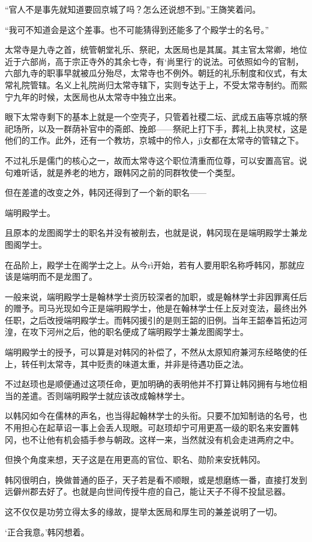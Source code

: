 “官人不是事先就知道要回京城了吗？怎么还说想不到。”王旖笑着问。

“我可不知道会是这个差事。也不可能猜得到还能多了个殿学士的名号。”

太常寺是九寺之首，统管朝堂礼乐、祭祀，太医局也是其属。其主官太常卿，地位近于六部尚，高于宗正寺外的其余七寺，有‘尚里行’的说法。可依照如今的官制，六部九寺的职事早就被瓜分殆尽，太常寺也不例外。朝廷的礼乐制度和仪式，有太常礼院管辖。名义上礼院尚归太常寺辖下，实则专达于上，不受太常寺制约。而熙宁九年的时候，太医局也从太常寺中独立出来。

眼下太常寺剩下的基本上就是一个空壳子，只管着社稷二坛、武成五庙等京城的祭祀场所，以及一群荫补官中的斋郎、挽郎——祭祀上打下手，葬礼上执灵杖，这是他们的工作。此外，还有一个教坊，京城中的伶人，jì女都在太常寺的管辖之下。

不过礼乐是儒门的核心之一，故而太常寺这个职位清重而位尊，可以安置高官。说句难听话，就是养老的地方，跟韩冈之前的同群牧使一个类型。

但在差遣的改变之外，韩冈还得到了一个新的职名——

端明殿学士。

且原本的龙图阁学士的职名并没有被削去，也就是说，韩冈现在是端明殿学士兼龙图阁学士。

在品阶上，殿学士在阁学士之上。从今rì开始，若有人要用职名称呼韩冈，那就应该是端明而不是龙图了。

一般来说，端明殿学士是翰林学士资历较深者的加职，或是翰林学士非因罪离任后的赠予。司马光现如今正是端明殿学士，他是在翰林学士任上反对变法，最终出外任职，之后改授端明殿学士。而韩冈援引的是则王韶的旧例。当年王韶奉旨拓边河湟，在攻下河州之后，他的职名便成了端明殿学士兼龙图阁学士。

端明殿学士的授予，可以算是对韩冈的补偿了，不然从太原知府兼河东经略使的任上，转任判太常寺，其中贬责的味道太重，并非是待遇功臣之法。

不过赵顼也是顺便通过这项任命，更加明确的表明他并不打算让韩冈拥有与地位相当的差遣。否则端明殿学士就应该改成翰林学士。

以韩冈如今在儒林的声名，也当得起翰林学士的头衔。只要不加知制诰的名号，也不用担心在起草诏一事上会丢人现眼。可赵顼却宁可用更髙一级的职名来安置韩冈，也不让他有机会插手参与朝政。这样一来，当然就没有机会走进两府之中。

但换个角度来想，天子这是在用更高的官位、职名、勋阶来安抚韩冈。

韩冈很明白，换做普通的臣子，天子若是看不顺眼，或是想磨练一番，直接打发到远僻州郡去好了。也就是向世间传授牛痘的自己，能让天子不得不投鼠忌器。

这不仅仅是功劳立得太多的缘故，提举太医局和厚生司的兼差说明了一切。

‘正合我意。’韩冈想着。

